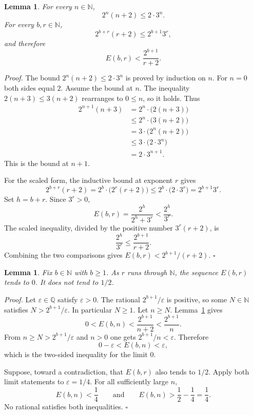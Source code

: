 \documentclass[11pt,letterpaper]{article}
\newcommand{\N}{\mathbb{N}}
\newcommand{\Q}{\mathbb{Q}}
\newtheorem{lemma}[theorem]{Lemma}
\newenvironment{proof}{\noindent\textit{Proof.}}{\hfill\(\square\)}
\begin{document}
\begin{lemma}
\label{lem:growth}
For every \(n\in\N\),
\[
2^{n}(n+2)\leq 2\cdot 3^{n}.
\]
For every \(b,r\in\N\),
\[
2^{b+r}(r+2)\leq 2^{b+1}3^{r},
\]
and therefore
\[
E(b,r)<\frac{2^{b+1}}{r+2}.
\]
\end{lemma}

\begin{proof}
The bound \(2^{n}(n+2)\leq 2\cdot 3^{n}\) is proved by induction on \(n\). For \(n=0\) both sides equal \(2\). Assume the bound at \(n\). The inequality \(2(n+3)\leq 3(n+2)\) rearranges to \(0\leq n\), so it holds. Thus
\begin{align*}
2^{n+1}(n+3)
&=2^{n}\cdot\bigl(2(n+3)\bigr)\\
&\leq 2^{n}\cdot\bigl(3(n+2)\bigr)\\
&=3\cdot\bigl(2^{n}(n+2)\bigr)\\
&\leq 3\cdot\bigl(2\cdot 3^{n}\bigr)\\
&=2\cdot 3^{n+1}.
\end{align*}
This is the bound at \(n+1\).

For the scaled form, the inductive bound at exponent \(r\) gives
\[
2^{b+r}(r+2)
=2^{b}\cdot\bigl(2^{r}(r+2)\bigr)
\leq 2^{b}\cdot\bigl(2\cdot 3^{r}\bigr)
=2^{b+1}3^{r}.
\]
Set \(h=b+r\). Since \(3^{r}>0\),
\[
E(b,r)=\frac{2^{h}}{2^{h}+3^{r}}<\frac{2^{h}}{3^{r}}.
\]
The scaled inequality, divided by the positive number \(3^{r}(r+2)\), is
\[
\frac{2^{h}}{3^{r}}\leq\frac{2^{b+1}}{r+2}.
\]
Combining the two comparisons gives \(E(b,r)<2^{b+1}/(r+2)\).
\end{proof}

\begin{lemma}
\label{lem:fixed}
Fix \(b\in\N\) with \(b\geq 1\). As \(r\) runs through \(\N\), the sequence \(E(b,r)\) tends to \(0\). It does not tend to \(1/2\).
\end{lemma}

\begin{proof}
Let \(\varepsilon\in\Q\) satisfy \(\varepsilon>0\). The rational \(2^{b+1}/\varepsilon\) is positive, so some \(N\in\N\) satisfies \(N>2^{b+1}/\varepsilon\). In particular \(N\geq 1\). Let \(n\geq N\). Lemma~\ref{lem:growth} gives
\[
0<E(b,n)<\frac{2^{b+1}}{n+2}<\frac{2^{b+1}}{n}.
\]
From \(n\geq N>2^{b+1}/\varepsilon\) and \(n>0\) one gets \(2^{b+1}/n<\varepsilon\). Therefore
\[
0-\varepsilon<E(b,n)<\varepsilon,
\]
which is the two-sided inequality for the limit \(0\).

Suppose, toward a contradiction, that \(E(b,r)\) also tends to \(1/2\). Apply both limit statements to \(\varepsilon=1/4\). For all sufficiently large \(n\),
\[
E(b,n)<\frac{1}{4}
\qquad\text{and}\qquad
E(b,n)>\frac{1}{2}-\frac{1}{4}=\frac{1}{4}.
\]
No rational satisfies both inequalities.
\end{proof}
\end{document}
